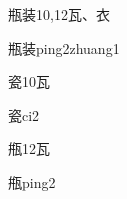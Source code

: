 \begin{entry}{瓶装}{10,12}{⽡、⾐}
  \begin{phonetics}{瓶装}{ping2zhuang1}
  \end{phonetics}
\end{entry}

\begin{entry}{瓷}{10}{⽡}
  \begin{phonetics}{瓷}{ci2}
  \end{phonetics}
\end{entry}

\begin{entry}{甁}{12}{⽡}
  \begin{phonetics}{甁}{ping2}
  \end{phonetics}
\end{entry}


